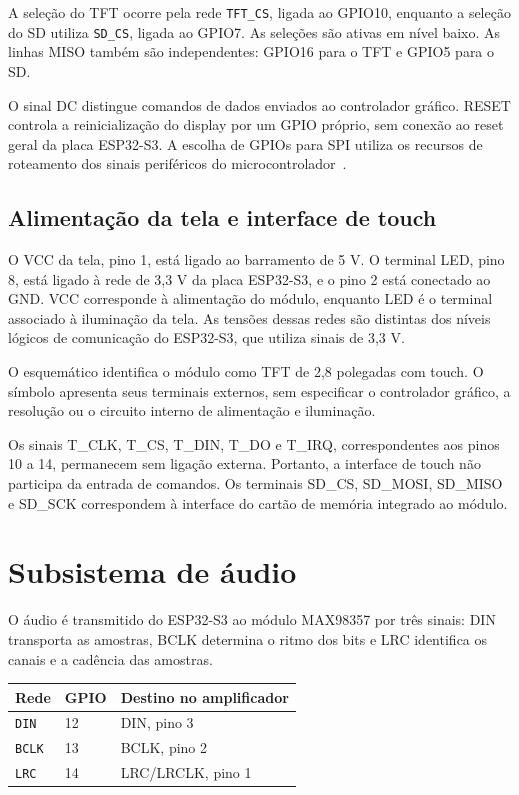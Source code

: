 \documentclass[12pt,a4paper]{article}
\begin{document}
A seleção do TFT ocorre pela rede \texttt{TFT\_CS}, ligada ao GPIO10, enquanto a seleção do SD utiliza \texttt{SD\_CS}, ligada ao GPIO7. As seleções são ativas em nível baixo. As linhas MISO também são independentes: GPIO16 para o TFT e GPIO5 para o SD.

O sinal DC distingue comandos de dados enviados ao controlador gráfico. RESET controla a reinicialização do display por um GPIO próprio, sem conexão ao reset geral da placa ESP32-S3. A escolha de GPIOs para SPI utiliza os recursos de roteamento dos sinais periféricos do microcontrolador~\cite{s3}.

\subsection{Alimentação da tela e interface de touch}
O VCC da tela, pino 1, está ligado ao barramento de 5 V. O terminal LED, pino 8, está ligado à rede de 3,3 V da placa ESP32-S3, e o pino 2 está conectado ao GND. VCC corresponde à alimentação do módulo, enquanto LED é o terminal associado à iluminação da tela. As tensões dessas redes são distintas dos níveis lógicos de comunicação do ESP32-S3, que utiliza sinais de 3,3 V.

O esquemático identifica o módulo como TFT de 2,8 polegadas com touch. O símbolo apresenta seus terminais externos, sem especificar o controlador gráfico, a resolução ou o circuito interno de alimentação e iluminação.

Os sinais T\_CLK, T\_CS, T\_DIN, T\_DO e T\_IRQ, correspondentes aos pinos 10 a 14, permanecem sem ligação externa. Portanto, a interface de touch não participa da entrada de comandos. Os terminais SD\_CS, SD\_MOSI, SD\_MISO e SD\_SCK correspondem à interface do cartão de memória integrado ao módulo.

\section{Subsistema de áudio}
O áudio é transmitido do ESP32-S3 ao módulo MAX98357 por três sinais: DIN transporta as amostras, BCLK determina o ritmo dos bits e LRC identifica os canais e a cadência das amostras.
\begin{center}
  \begin{tabular}{lll}
    \toprule
    \textbf{Rede} & \textbf{GPIO} & \textbf{Destino no amplificador}\\
    \midrule
    \texttt{DIN} & 12 & DIN, pino 3\\
    \texttt{BCLK} & 13 & BCLK, pino 2\\
    \texttt{LRC} & 14 & LRC/LRCLK, pino 1\\
    \bottomrule
  \end{tabular}
\end{center}
\end{document}
